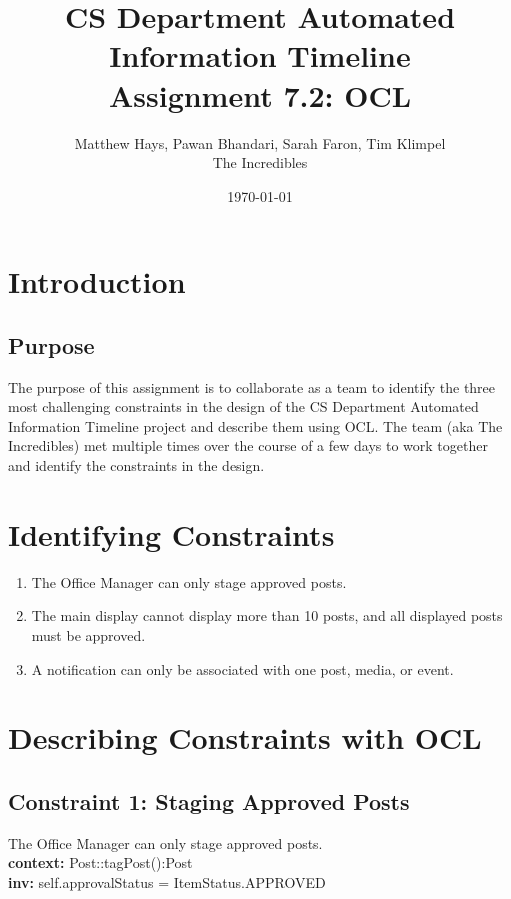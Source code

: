 \documentclass{article}
\title{CS Department Automated Information Timeline \\ Assignment 7.2: OCL}
\date{\today}
\author{Matthew Hays, Pawan Bhandari, Sarah Faron, Tim Klimpel \\ The Incredibles}
\begin{document}
\maketitle
\newpage
\tableofcontents
\listoffigures
\newpage
\section{Introduction}
\subsection{Purpose}
The purpose of this assignment is to collaborate as a team to identify the three most challenging constraints in the design of the CS Department Automated Information Timeline project and describe them using OCL. The team (aka The Incredibles) met multiple times over the course of a few days to work together and identify the constraints in the design.

\section{Identifying Constraints}
\begin{enumerate}
    \item The Office Manager can only stage approved posts.
    \item The main display cannot display more than 10 posts, and all displayed posts must be approved.
    \item A notification can only be associated with one post, media, or event.
\end{enumerate}

\section{Describing Constraints with OCL}

\subsection{Constraint 1: Staging Approved Posts}

The Office Manager can only stage approved posts. \\

\textbf{context:} Post::tagPost():Post \\
\textbf{inv:} self.approvalStatus = ItemStatus.APPROVED \\
\end{document}

